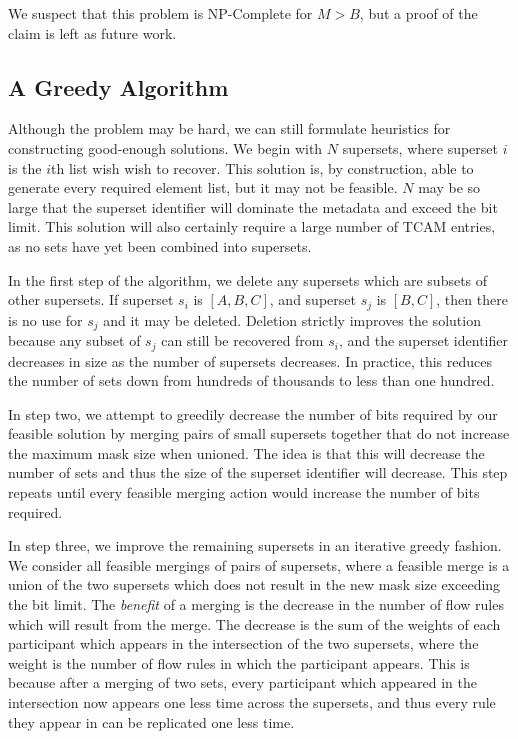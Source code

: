 We suspect that this problem is NP-Complete for \mbox{$M > B$}, but a proof of the claim is left as future work. 

\subsection{A Greedy Algorithm}

Although the problem may be hard, we can still formulate heuristics for constructing good-enough solutions. We begin with $N$ supersets, where superset $i$ is the $i$th list wish wish to recover. This solution is, by construction, able to generate every required element list, but it may not be feasible. $N$ may be so large that the superset identifier will dominate the metadata and exceed the bit limit. This solution will also certainly require a large number of TCAM entries, as no sets have yet been combined into supersets.

In the first step of the algorithm, we delete any supersets which are subsets of other supersets. If superset $s_i$ is $[A,B,C]$, and superset $s_j$ is $[B,C]$, then there is no use for $s_j$ and it may be deleted. Deletion strictly improves the solution because any subset of $s_j$ can still be recovered from $s_i$, and the superset identifier decreases in size as the number of supersets decreases. In practice, this reduces the number of sets down from hundreds of thousands to less than one hundred.

In step two, we attempt to greedily decrease the number of bits required by our feasible solution by merging pairs of small supersets together that do not increase the maximum mask size when unioned. The idea is that this will decrease the number of sets and thus the size of the superset identifier will decrease. This step repeats until every feasible merging action would increase the number of bits required. 

In step three, we improve the remaining supersets in an iterative greedy fashion. We consider all feasible mergings of pairs of supersets, where a feasible merge is a union of the two supersets which does not result in the new mask size exceeding the bit limit. The \textit{benefit} of a merging is the decrease in the number of flow rules which will result
from the merge. The decrease is the sum of the weights of each participant which appears in the intersection of the two supersets, where the weight is the number of flow rules in which the participant appears. This is because after a merging of two sets, every participant which appeared in the intersection now appears one less time across the supersets, and thus every rule they appear in can be replicated one less time. 

